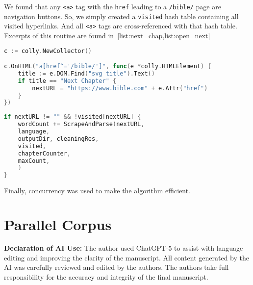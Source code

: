 \documentclass{article}
\begin{document}
We found that any \texttt{<a>} tag with the \texttt{href} leading to a \texttt{/bible/}
page are navigation buttons. So, we simply created a \texttt{visited} hash table 
containing all visited hyperlinks. And all \texttt{<a>} tags are cross-referenced with 
that hash table. Excerpts of this routine are found in~\cref{list:next_chap,list:open_next}

\begin{lstlisting}[language=Go, caption={Finding the next chapter using the HTML tags}, label={list:next_chap}]
c := colly.NewCollector()

c.OnHTML("a[href^='/bible/']", func(e *colly.HTMLElement) {
    title := e.DOM.Find("svg title").Text()
    if title == "Next Chapter" {
        nextURL = "https://www.bible.com" + e.Attr("href")
    }
})    
\end{lstlisting}

\begin{lstlisting}[language=Go, caption={Opening the next chapter}, label={list:open_next}]
if nextURL != "" && !visited[nextURL] {
    wordCount += ScrapeAndParse(nextURL,
    language,
    outputDir, cleaningRes,
    visited,
    chapterCounter,
    maxCount,
    )
}
\end{lstlisting}

Finally, concurrency was used to make the algorithm efficient.


\section{Parallel Corpus}




\vfill
{\footnotesize
    \noindent\textbf{Declaration of AI Use:} The author used ChatGPT-5 to 
    assist with language editing and improving the clarity of the manuscript. 
    All content generated by the AI was carefully reviewed and edited by the 
    authors. The authors take full responsibility for the accuracy and integrity 
    of the final manuscript.
    \par}
\end{document}
